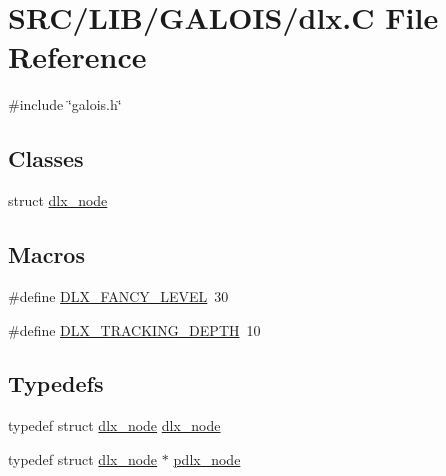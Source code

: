 \hypertarget{_l_i_b_2_g_a_l_o_i_s_2dlx_8_c}{}\section{S\+R\+C/\+L\+I\+B/\+G\+A\+L\+O\+I\+S/dlx.C File Reference}
\label{_l_i_b_2_g_a_l_o_i_s_2dlx_8_c}
{\ttfamily \#include \char`\"{}galois.\+h\char`\"{}}\newline
\subsection*{Classes}
\begin{DoxyCompactItemize}
\item 
struct \mbox{\hyperlink{structdlx__node}{dlx\+\_\+node}}
\end{DoxyCompactItemize}
\subsection*{Macros}
\begin{DoxyCompactItemize}
\item 
\#define \mbox{\hyperlink{_l_i_b_2_g_a_l_o_i_s_2dlx_8_c_af0bedc019ea81b4c55265b23b8c312a3}{D\+L\+X\+\_\+\+F\+A\+N\+C\+Y\+\_\+\+L\+E\+V\+EL}}~30
\item 
\#define \mbox{\hyperlink{_l_i_b_2_g_a_l_o_i_s_2dlx_8_c_a07547c68fed3569418b9f9223af7478c}{D\+L\+X\+\_\+\+T\+R\+A\+C\+K\+I\+N\+G\+\_\+\+D\+E\+P\+TH}}~10
\end{DoxyCompactItemize}
\subsection*{Typedefs}
\begin{DoxyCompactItemize}
\item 
typedef struct \mbox{\hyperlink{structdlx__node}{dlx\+\_\+node}} \mbox{\hyperlink{_l_i_b_2_g_a_l_o_i_s_2dlx_8_c_a0f3a03c2569c95d095b4c39d5a7beab7}{dlx\+\_\+node}}
\item 
typedef struct \mbox{\hyperlink{structdlx__node}{dlx\+\_\+node}} $\ast$ \mbox{\hyperlink{_l_i_b_2_g_a_l_o_i_s_2dlx_8_c_a09898f11bc2b90a1c99edf2ebd49756b}{pdlx\+\_\+node}}
\end{DoxyCompactItemize}
